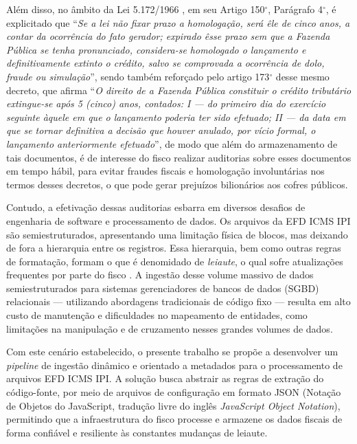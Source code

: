 Além disso, no âmbito da Lei 5.172/1966 \cite{lei-5172}, em seu
Artigo 150\(^\circ\), Parágrafo 4\(^\circ\), é explicitado que
``\textit{Se a lei não fixar prazo a homologação, será êle de cinco anos, a
contar da ocorrência do fato gerador; expirado êsse prazo sem que a Fazenda
Pública se tenha pronunciado, considera-se homologado o lançamento e
definitivamente extinto o crédito, salvo se comprovada a ocorrência de dolo,
fraude ou simulação}'', sendo também reforçado pelo artigo 173\(^\circ\) desse
mesmo decreto, que afirma ``\textit{O direito de a Fazenda Pública constituir o
crédito tributário extingue-se após 5 (cinco) anos, contados: I --- do primeiro
dia do exercício seguinte àquele em que o lançamento poderia ter sido efetuado;
II --- da data em que se tornar definitiva a decisão que houver anulado, por
vício formal, o lançamento anteriormente efetuado}'', de modo que além do
armazenamento de tais documentos, é de interesse do fisco realizar auditorias
sobre esses documentos em tempo hábil, para evitar fraudes fiscais e
homologação involuntárias nos termos desses decretos, o que pode gerar
prejuízos bilionários aos cofres públicos.

Contudo, a efetivação dessas auditorias esbarra em diversos desafios de
engenharia de software e processamento de dados. Os arquivos da EFD ICMS IPI
são semiestruturados, apresentando uma limitação física de blocos, mas deixando
de fora a hierarquia entre os registros. Essa hierarquia, bem como outras
regras de formatação, formam o que é denomidado de \textit{leiaute}, o qual
sofre atualizações frequentes por parte do fisco \cite{nota_tecnica_efd}.
A ingestão desse volume massivo de dados semiestruturados para sistemas
gerenciadores de bancos de dados (SGBD) relacionais --- utilizando abordagens
tradicionais de código fixo --- resulta em alto custo de manutenção e
dificuldades no mapeamento de entidades, como limitações na manipulação e de
cruzamento nesses grandes volumes de dados.

Com este cenário estabelecido, o presente trabalho se propõe a desenvolver um
\textit{pipeline} de ingestão dinâmico e orientado a metadados para o
processamento de arquivos EFD ICMS IPI. A solução busca abstrair as regras de
extração do código-fonte, por meio de arquivos de configuração em formato JSON
(Notação de Objetos do JavaScript, tradução livre do inglês
\textit{JavaScript Object Notation}), permitindo que a infraestrutura do fisco
processe e armazene os dados fiscais de forma confiável e resiliente às
constantes mudanças de leiaute.

